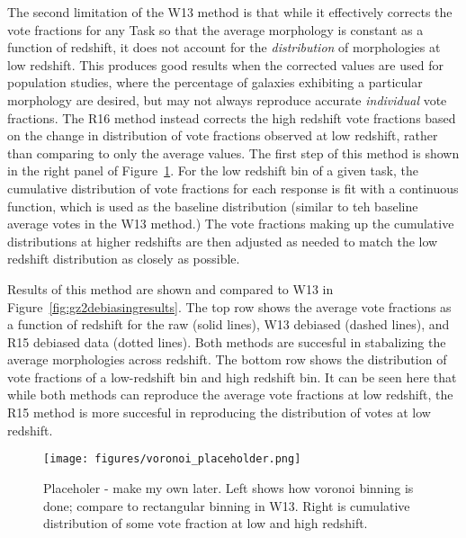 The second limitation of the W13 method is that while it effectively corrects the vote fractions for any Task so that the average morphology is constant as a function of redshift, it does not account for the \emph{distribution} of morphologies at low redshift. This produces good results when the corrected values are used for population studies, where the percentage of galaxies exhibiting a particular morphology are desired, but may not always reproduce accurate \emph{individual} vote fractions. The R16 method instead corrects the high redshift vote fractions based on the change in distribution of vote fractions observed at low redshift, rather than comparing to only the average values. The first step of this method is shown in the right panel of Figure~\ref{fig:voronoi}. For the low redshift bin of a given task, the cumulative distribution of vote fractions for each response is fit with a continuous function, which is used as the baseline distribution (similar to teh baseline average votes in the W13 method.) The vote fractions making up the cumulative distributions at higher redshifts are then adjusted as needed to match the low redshift distribution as closely as possible.

Results of this method are shown and compared to W13 in Figure~\ref{fig:gz2debiasingresults}. The top row shows the average vote fractions as a function of redshift for the raw (solid lines), W13 debiased (dashed lines), and R15 debiased data (dotted lines). Both methods are succesful in stabalizing the average morphologies across redshift. The bottom row shows the distribution of vote fractions of a low-redshift bin and high redshift bin. It can be seen here that while both methods can reproduce the average vote fractions at low redshift, the R15 method is more succesful in reproducing the distribution of votes at low redshift.  
 



\begin{figure}
\centering
\texttt{[image: figures/voronoi\_placeholder.png]}
\caption{Placeholer - make my own later. Left shows how voronoi binning is done; compare to rectangular binning in W13. Right is cumulative distribution of some vote fraction at low and high redshift.}
\label{fig:voronoi}
\end{figure}








